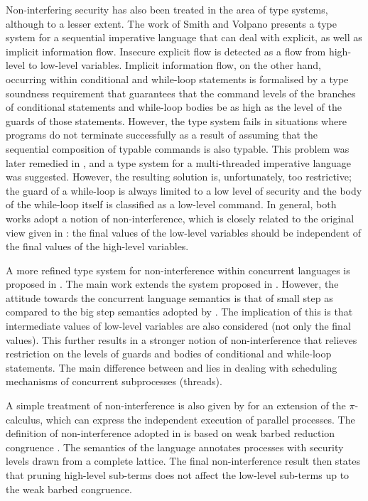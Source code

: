 \documentclass[10pt,a4paper,final,oneside,fleqn]{book}
\begin{document}
Non-interfering security has also been treated in the area of type systems, although to a lesser extent.  The work of Smith and Volpano \cite{volpano1} presents a type system for a sequential imperative language that can deal with explicit, as well as implicit information flow.  Insecure explicit flow is detected as a flow from high-level to low-level variables.  Implicit information flow, on the other hand, occurring within conditional and while-loop statements is formalised by a type soundness requirement that guarantees that the command levels of the branches of conditional statements and while-loop bodies be as high as the level of the guards of those statements.  However, the type system fails in situations where programs do not terminate successfully as a result of assuming that the sequential composition of typable commands is also typable.  This problem was later remedied in \cite{volpano2}, and a type system for a multi-threaded imperative language was suggested.  However, the resulting solution is, unfortunately, too restrictive; the guard of a while-loop is always limited to a low level of security and the body of the while-loop itself is classified as a low-level command.  In general, both works \cite{volpano1,volpano2} adopt a notion of non-interference, which is closely related to the original view given in \cite{goguen1}: the final values of the low-level variables should be independent of the final values of the high-level variables.

A more refined type system for non-interference within concurrent languages is proposed in \cite{boudol1,boudol2}.  The main work extends the system proposed in \cite{volpano2}.  However, the attitude towards the concurrent language semantics is that of small step as compared to the big step semantics adopted by \cite{volpano2}.  The implication of this is that intermediate values of low-level variables are also considered (not only the final values).  This further results in a stronger notion of non-interference that relieves restriction on the levels of guards and bodies of conditional and while-loop statements.  The main difference between \cite{boudol1} and \cite{boudol2} lies in dealing with scheduling mechanisms of concurrent subprocesses (threads).

A simple treatment of non-interference is also given by \cite{pottier1} for an extension of the $\pi$-calculus, which can express the independent execution of parallel processes.  The definition of non-interference adopted in \cite{pottier1} is based on weak barbed reduction congruence \cite{sangiorgi1}.  The semantics of the language annotates processes with security levels drawn from a complete lattice.  The final non-interference result then states that pruning high-level sub-terms does not affect the low-level sub-terms up to the weak barbed congruence.
\end{document}
